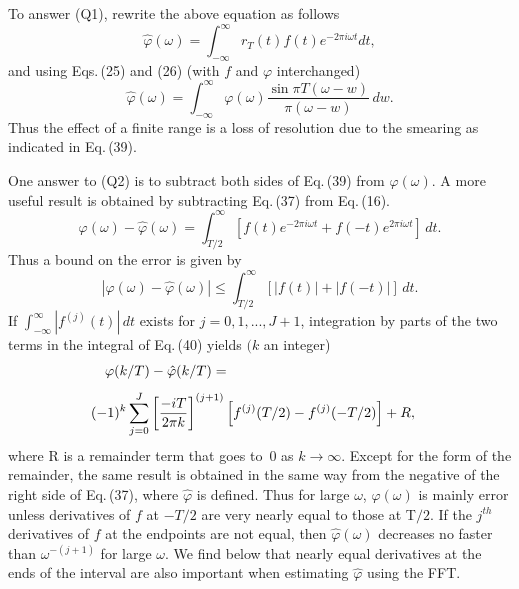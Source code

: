 \documentclass[twoside]{MATH77}
\begin{document}
To answer (Q1), rewrite the above equation as follows
\begin{equation}\label{O38}
\hat \varphi (\omega )=\int_{-\infty }^\infty r_T(t)f(t)e^{-2\pi
i\omega t}dt,
\end{equation}
and using Eqs.\,(25) and (26) (with $f$ and $\varphi $ interchanged)
\begin{equation}\label{O39}
\hat \varphi (\omega )=\int_{-\infty }^\infty \varphi (\omega )
\frac{\sin \pi T(\omega -w)}{\pi (\omega -w)}\,dw.
\end{equation}
Thus the effect of a finite range is a loss of resolution due to the
smearing as indicated in Eq.\,(39).

One answer to (Q2) is to subtract both sides of Eq.\,(39) from $\varphi
(\omega )$. A more useful result is obtained by subtracting Eq.\,(37)
from Eq.\,(16).
\begin{equation}\label{O40}
\varphi (\omega )-\hat \varphi (\omega )=\int_{T/2}^\infty \left[
f(t)e^{-2\pi i\omega t}+f(-t)e^{2\pi i\omega t}\right] \,dt.
\end{equation}
Thus a bound on the error is given by
\begin{equation}\label{O41}
|\varphi (\omega )-\hat \varphi (\omega )|\leq \int_{T/2}^\infty
\left[ |f(t)|+|f(-t)|\right] \,dt.
\end{equation}
If $\int_{-\infty }^\infty |f^{(j)}(t)|\,dt$ exists for $j=0,1,...,J+1$,
integration by parts of the two terms in the integral of Eq.\,(40) yields $(k$ an
integer)
\begin{multline}\label{O42}
\varphi (k/T)-\hat \varphi (k/T)=\hfill\vspace{4pt} \\
\hspace{-10pt}(-1)^k\sum_{j=0}^J\left[ \frac{-iT}{2\pi k}\right]
^{(j+1)}\left[ f^{(j)}(T/2)-f^{(j)}(-T/2)\right] +R,
\end{multline}
where R is a remainder term that goes to~0 as $k\rightarrow \infty $.
Except for the form of the remainder, the same result is obtained in the
same way from the negative of the right side of Eq.\,(37), where $\hat
\varphi $ is defined. Thus for large $\omega $, $\hat \varphi (\omega )$ is
mainly error unless derivatives of $f$ at $-T/2$ are very nearly equal to
those at T$/2$. If the $j^{th}$ derivatives of $f$ at the endpoints are not
equal, then $\hat \varphi (\omega )$ decreases no faster than $\omega
^{-(j+1)}$ for large $\omega $. We find below that nearly equal derivatives
at the ends of the interval are also important when estimating $\hat
\varphi $ using the FFT.
\end{document}
